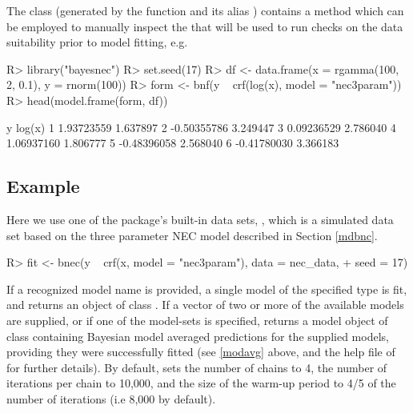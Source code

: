 \documentclass[
  shortnames]{jss}
\begin{document}
The class  (generated by the function  and its alias ) contains a  method which can be employed to manually inspect the  that will be used to run checks on the data suitability prior to model fitting, e.g.

\begin{CodeChunk}
\begin{CodeInput}
R> library("bayesnec")
R> set.seed(17)
R> df <- data.frame(x = rgamma(100, 2, 0.1), y = rnorm(100))
R> form <- bnf(y ~ crf(log(x), model = "nec3param"))
R> head(model.frame(form, df))
\end{CodeInput}
\begin{CodeOutput}
            y   log(x)
1  1.93723559 1.637897
2 -0.50355786 3.249447
3  0.09236529 2.786040
4  1.06937160 1.806777
5 -0.48396058 2.568040
6 -0.41780030 3.366183
\end{CodeOutput}
\end{CodeChunk}

\subsection[Example]{Example}\label{example}

Here we use one of the package's built-in data sets, , which is a simulated data set based on the three parameter NEC model  described in Section \ref{mdbnc}.

\begin{CodeChunk}
\begin{CodeInput}
R> fit <- bnec(y ~ crf(x, model = "nec3param"), data = nec_data,
+             seed = 17)
\end{CodeInput}
\end{CodeChunk}

If a recognized model name is provided, a single model of the specified type is fit, and  returns an object of class . If a vector of two or more of the available models are supplied, or if one of the model-sets is specified,  returns a model object of class  containing Bayesian model averaged predictions for the supplied models, providing they were successfully fitted (see \ref{modavg} above, and the help file of  for further details). By default,  sets the number of chains to 4, the number of iterations per chain to 10,000, and the size of the warm-up period to 4/5 of the number of iterations (i.e 8,000 by default).
\end{document}
